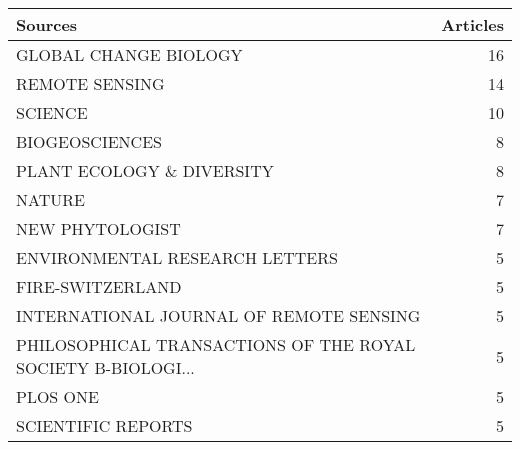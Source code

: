 
\begin{tabular}{lr}
\toprule
Sources & Articles\\
\midrule
GLOBAL CHANGE BIOLOGY & 16\\
REMOTE SENSING & 14\\
SCIENCE & 10\\
BIOGEOSCIENCES & 8\\
PLANT ECOLOGY \& DIVERSITY & 8\\
\addlinespace
NATURE & 7\\
NEW PHYTOLOGIST & 7\\
ENVIRONMENTAL RESEARCH LETTERS & 5\\
FIRE-SWITZERLAND & 5\\
INTERNATIONAL JOURNAL OF REMOTE SENSING & 5\\
\addlinespace
PHILOSOPHICAL TRANSACTIONS OF THE ROYAL SOCIETY B-BIOLOGI... & 5\\
PLOS ONE & 5\\
SCIENTIFIC REPORTS & 5\\
\bottomrule
\end{tabular}